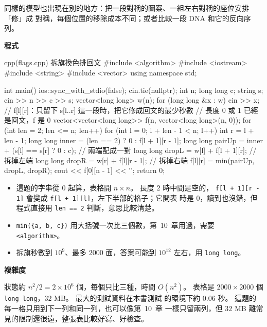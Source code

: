 同樣的模型也出現在別的地方：把一段對稱的圖案、一組左右對稱的座位安排「修」成
對稱，每個位置的移除成本不同；或者比較一段 DNA 和它的反向序列。

\textbf{程式}

\begin{example}[label=ex:ivdp-flags]{cpp}{(flags.cpp) 拆旗換色排回文}
#include <algorithm>
#include <iostream>
#include <string>
#include <vector>
using namespace std;

int main() {
    ios::sync_with_stdio(false);
    cin.tie(nullptr);
    int n;
    long long c;
    string s;
    cin >> n >> c >> s;
    vector<long long> w(n);
    for (long long &x : w) {
        cin >> x;
    }
    // f[l][r]：只留下 s[l..r] 這一段時，把它修成回文的最少秒數
    // 長度 0 或 1 已經是回文，f 是 0
    vector<vector<long long>> f(n, vector<long long>(n, 0));
    for (int len = 2; len <= n; len++) {
        for (int l = 0; l + len - 1 < n; l++) {
            int r = l + len - 1;
            long long inner = (len == 2) ? 0 : f[l + 1][r - 1];
            long long pairUp = inner + (s[l] == s[r] ? 0 : c);   // 兩端配成一對
            long long dropL = w[l] + f[l + 1][r];                 // 拆掉左端
            long long dropR = w[r] + f[l][r - 1];                 // 拆掉右端
            f[l][r] = min({pairUp, dropL, dropR});
        }
    }
    cout << f[0][n - 1] << '\n';
    return 0;
}
\end{example}


\begin{itemize}
\item 這題的字串從 $0$ 起算，表格開 $n \times n$。 長度 $2$ 時中間是空的，
\texttt{f[l + 1][r - 1]} 會變成 \texttt{f[l + 1][l]}，左下半部的格子；它開表
時是 $0$，讀到也沒錯，但程式直接用 \texttt{len == 2} 判斷，意思比較清楚。
\item \texttt{min(\{a, b, c\})} 用大括號一次比三個數，第~10~章用過，需要
\texttt{<algorithm>}。
\item 拆旗秒數到 $10^9$、最多 $2000$ 面，答案可能到 $10^{12}$ 左右，用
\texttt{long long}。
\end{itemize}

\textbf{複雜度}

狀態約 $n^2/2 = 2 \times 10^6$ 個，每個只比三種，時間 $O(n^2)$。 表格是
$2000 \times 2000$ 個 \texttt{long long}，$32$ MB。 最大的測試資料在本書測試
的環境下約 $0.06$ 秒。 這題的每一格只用到下一列和同一列，也可以像第~10~章
一樣只留兩列，但 $32$ MB 離常見的限制還很遠，整張表比較好寫、好檢查。

